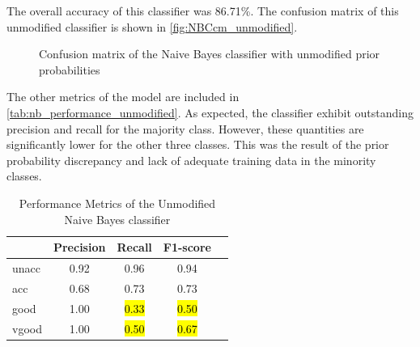 \documentclass[a4paper]{article}
\begin{document}
The overall accuracy of this classifier was 86.71\%. The confusion matrix of this unmodified classifier is shown in \autoref{fig:NBCcm_unmodified}. 

\begin{figure} [h]
  \caption{Confusion matrix of the Naive Bayes classifier with unmodified prior probabilities} 
  \label{fig:NBCcm_unmodified}
\end{figure}


The other metrics of the model are included in \autoref{tab:nb_performance_unmodified}. As expected, the classifier exhibit outstanding precision and recall for the majority class. However, these quantities are significantly lower for the other three classes. This was the result of the prior probability discrepancy and lack of adequate training data in the minority classes.
\begin{table}[ht]
  \centering
  \caption{Performance Metrics of the Unmodified Naive Bayes classifier}
  \label{tab:nb_performance_unmodified}
  \begin{tabular}{lcccc}
  \toprule
  \textbf{ } & \textbf{Precision} & \textbf{Recall} & \textbf{F1-score} \\
  \midrule
  unacc & 0.92 & 0.96 & 0.94\\
  acc  & 0.68 & 0.73 & 0.73\\
  good & 1.00 & \hl{0.33} & \hl{0.50}\\
  vgood & 1.00 & \hl{0.50} & \hl{0.67}\\
  \bottomrule
  \end{tabular}
\end{table}
\end{document}
